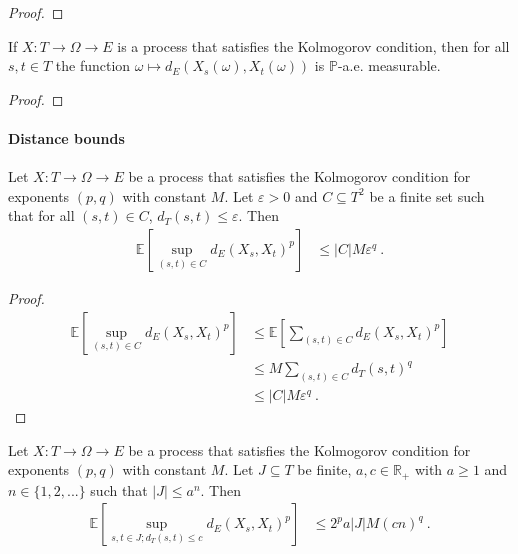 \begin{proof}\leanok

\end{proof}


\begin{lemma}\label{lem:IsKolmogorovProcess.aemeasurable_edist}
  \leanok
If $X : T \to \Omega \to E$ is a process that satisfies the Kolmogorov condition, then for all $s,t \in T$ the function $\omega \mapsto d_E(X_s(\omega), X_t(\omega))$ is $\mathbb{P}$-a.e. measurable.
\end{lemma}

\begin{proof}\leanok

\end{proof}

\paragraph{Distance bounds}

\begin{lemma}\label{lem:integral_sup_rpow_dist_le_card_mul_rpow}
  \leanok
Let $X : T \to \Omega \to E$ be a process that satisfies the Kolmogorov condition for exponents $(p,q)$ with constant $M$.
Let $\varepsilon > 0$ and $C \subseteq T^2$ be a finite set such that for all $(s, t) \in C$, $d_T(s, t) \le \varepsilon$.
Then
\begin{align*}
  \mathbb{E}\left[\sup_{(s,t) \in C} d_E(X_s, X_t)^p \right]
  &\le \vert C \vert M \varepsilon^q
  \: .
\end{align*}
\end{lemma}

\begin{proof}\leanok
\begin{align*}
  \mathbb{E}\left[\sup_{(s,t) \in C} d_E(X_s, X_t)^p \right]
  &\le \mathbb{E}\left[\sum_{(s,t) \in C} d_E(X_s, X_t)^p \right]
  \\
  &\le M \sum_{(s,t) \in C} d_T(s, t)^q
  \\
  &\le \vert C \vert M \varepsilon^q
  \: .
\end{align*}
\end{proof}


\begin{lemma}\label{lem:integral_sup_rpow_dist_of_dist_le}
  \leanok
Let $X : T \to \Omega \to E$ be a process that satisfies the Kolmogorov condition for exponents $(p,q)$ with constant $M$.
Let $J \subseteq T$ be finite, $a, c \in \mathbb R_+$ with $a \ge 1$ and $n \in \{1, 2, ...\}$ such that $|J| \le a^n$.
Then
\begin{align*}
  \mathbb{E} \left[ \sup_{s, t \in J; d_T(s, t) \le c} d_E(X_s, X_t)^p \right]
  &\le 2^p a |J| M (cn)^q
  \: .
\end{align*}
\end{lemma}

